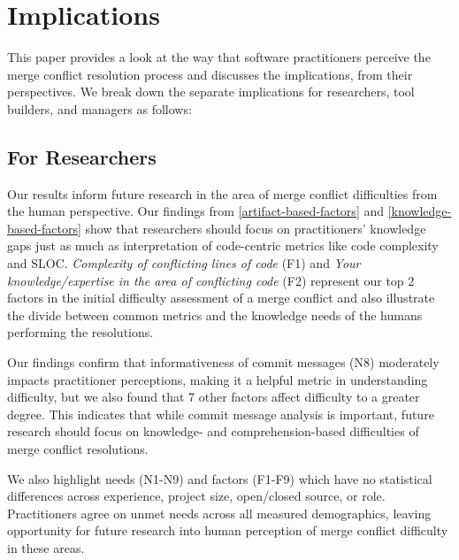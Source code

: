 \section{Implications}\label{implications}

This paper provides a look at the way that software practitioners perceive the merge conflict resolution process and discusses the implications, from their perspectives. We break down the separate implications for researchers, tool builders, and managers as follows:

\subsection{For Researchers}
Our results inform future research in the area of merge conflict difficulties from the human perspective.
Our findings from \ref{artifact-based-factors} and \ref{knowledge-based-factors} show that researchers should focus on practitioners' knowledge gaps just as much as interpretation of code-centric metrics like code complexity and SLOC. \textit{Complexity of conflicting lines of code} (F1) and \textit{Your knowledge/expertise in the area of conflicting code} (F2) represent our top 2 factors in the initial difficulty assessment of a merge conflict and also illustrate the divide between common metrics and the knowledge needs of the humans performing the resolutions.
 
Our findings confirm that informativeness of commit messages (N8) moderately impacts practitioner perceptions, making it a helpful metric in understanding difficulty, but we also found that 7 other factors affect difficulty to a greater degree. This indicates that while commit message analysis is important, future research should focus on knowledge- and comprehension-based difficulties of  merge conflict resolutions.

We also highlight needs (N1-N9) and factors (F1-F9) which have no statistical differences across experience, project size, open/closed source, or role. Practitioners agree on unmet needs across all measured demographics, leaving opportunity for future research into human perception of merge conflict difficulty in these areas.

